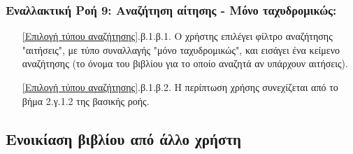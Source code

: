 \documentclass[12pt,a4paper]{article}
\begin{document}
\subsubsection*{Εναλλακτική Ροή 9: Αναζήτηση αίτησης - Μόνο ταχυδρομικώς:}
\begin{enumerate}
    \item[\ref{Επιλογή τύπου αναζήτησης}.β.1.β.1.] Ο χρήστης επιλέγει φίλτρο αναζήτησης "αιτήσεις", με τύπο συναλλαγής "μόνο ταχυδρομικώς", και εισάγει ένα κείμενο αναζήτησης (το όνομα του βιβλίου για το οποίο αναζητά αν υπάρχουν αιτήσεις).
    \item[\ref{Επιλογή τύπου αναζήτησης}.β.1.β.2.] Η περίπτωση χρήσης συνεχίζεται από το βήμα 2.γ.1.2 της βασικής ροής.
\end{enumerate}


\subsection{Ενοικίαση βιβλίου από άλλο χρήστη}
\label{Rental Use Case}
\end{document}
